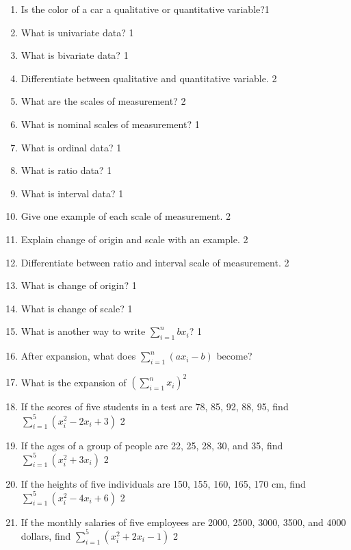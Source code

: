 \documentclass[a4paper,oneside]{book}
\begin{document}
\begin{enumerate}
\item Is the color of a car a qualitative or quantitative variable?\hfill 1

\item What is univariate data? \hfill 1

\item What is bivariate data? \hfill 1

\item Differentiate between qualitative and quantitative variable. \hfill 2

\item What are the scales of measurement? \hfill 2

\item What is nominal scales of measurement? \hfill 1

\item What is ordinal data? \hfill 1

\item What is ratio data? \hfill 1

\item What is interval data? \hfill 1

\item Give one example of each scale of measurement. \hfill 2

\item Explain change of origin and scale with an example. \hfill 2

\item Differentiate between ratio and interval scale of measurement. \hfill 2

\item What is change of origin? \hfill 1

\item What is change of scale? \hfill 1

\item What is another way to write $\displaystyle \sum_{i=1}^n bx_i$?  \hfill 1

\item After expansion, what does 
$\displaystyle \sum_{i=1}^n \left( ax_i-b \right)$ become?

\item What is the expansion of $\displaystyle \left( \sum_{i=1}^n x_i\right)^2$

\item 
If the scores of five students in a test are 78, 85, 92, 88, 95, 
find $\displaystyle \sum_{i=1}^5 (x_i^2 - 2x_i + 3)$ \hfill 2

\item 
If the ages of a group of people are 22, 25, 28, 30, and 35, 
find $\displaystyle \sum_{i=1}^5 (x_i^2 + 3x_i)$ \hfill 2

\item 
If the heights of five individuals are 150, 155, 160, 165, 170 cm, 
find $\displaystyle \sum_{i=1}^5 (x_i^2 - 4x_i + 6)$ \hfill 2

\item 
If the monthly salaries of five employees are 2000, 2500, 3000, 3500, and 4000 
dollars, find $\displaystyle \sum_{i=1}^5 (x_i^2 + 2x_i - 1)$ \hfill 2


\end{enumerate}
\end{document}
